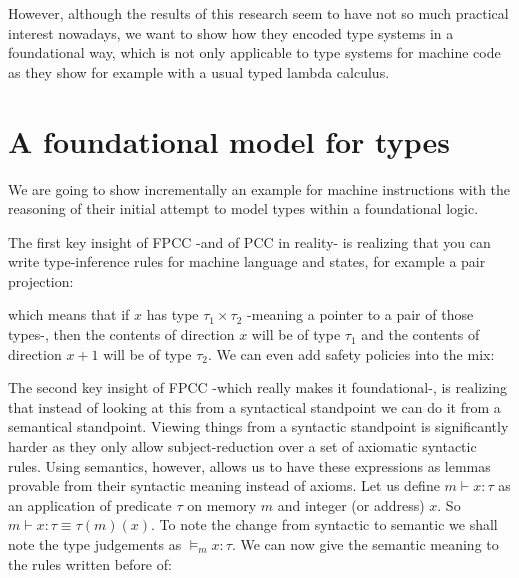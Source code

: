 \documentclass{article}
\begin{document}
However, although the results of this research seem to 
have not so much practical interest nowadays, we want to
show how they encoded type systems in a foundational way, 
which is not only applicable to type systems for machine 
code as they show for example with a usual typed lambda 
calculus.

\section*{A foundational model for types}

We are going to show incrementally an example for machine 
instructions with the reasoning of their initial attempt 
to model types within a foundational logic.

The first key insight of FPCC -and of PCC in reality- 
is realizing that you can write type-inference rules
for machine language and states, for example a pair 
projection:

\begin{prooftree}
\end{prooftree}

which means that if $x$ has type $\tau_1\times\tau_2$ 
-meaning a pointer to a pair of those types-, then 
the contents of direction $x$ will be of type $\tau_1$ 
and the contents of direction $x+1$ will be of type 
$\tau_2$. We can even add safety policies into the mix:

\begin{prooftree}
\end{prooftree}

The second key insight of FPCC -which really makes it 
foundational-,  is realizing that instead of looking
at this from a syntactical standpoint we can do it 
from a semantical standpoint. Viewing things from a 
syntactic standpoint is significantly harder as they
only allow subject-reduction over a set of axiomatic 
syntactic rules. Using semantics, however, allows us
to have these expressions as lemmas provable from 
their syntactic meaning instead of axioms. Let us 
define $m\vdash x:\tau$ as an application of predicate
$\tau$ on memory $m$ and integer (or address) $x$.
So $m\vdash x:\tau \equiv \tau (m)(x)$. To note the 
change from syntactic to semantic we shall note the 
type judgements as $\models_m x: \tau$. We can now give 
the semantic meaning to the rules written before of:
\end{document}
